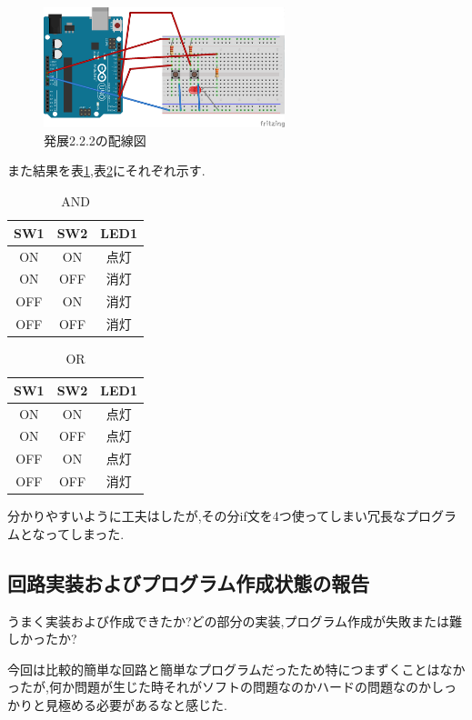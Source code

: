 \documentclass{jarticle}
\begin{document}
\begin{figure}[H]
\begin{center}
\includegraphics[width=7.0cm]{images/hatten2-2-2_bread.png}
\caption{発展2.2.2の配線図}
\label{fig:hatten2-2-2bread}
\end{center}
\end{figure}

また結果を表\ref{table:and},表\ref{table:or}にそれぞれ示す.

\begin{table}[H]
\centering
\caption{AND}
\label{table:and}
\begin{center}
\begin{tabular}{c|c|c}
\hline \hline
SW1 & SW2 & LED1\\ \hline
ON & ON &点灯 \\
ON& OFF & 消灯 \\
OFF& ON& 消灯\\
OFF& OFF & 消灯\\ \hline
\end{tabular}
\end{center}
\end{table}

\begin{table}[H]
\centering
\caption{OR}
\label{table:or}
\begin{center}
\begin{tabular}{c|c|c}
\hline \hline
SW1 & SW2 & LED1\\ \hline
ON & ON &点灯 \\
ON& OFF & 点灯 \\
OFF& ON& 点灯\\
OFF& OFF & 消灯\\ \hline
\end{tabular}
\end{center}
\end{table}
分かりやすいように工夫はしたが,その分if文を4つ使ってしまい冗長なプログラムとなってしまった.
\subsection{回路実装およびプログラム作成状態の報告}
うまく実装および作成できたか?どの部分の実装,プログラム作成が失敗または難しかったか?

今回は比較的簡単な回路と簡単なプログラムだったため特につまずくことはなかったが,何か問題が生じた時それがソフトの問題なのかハードの問題なのかしっかりと見極める必要があるなと感じた.
\end{document}
